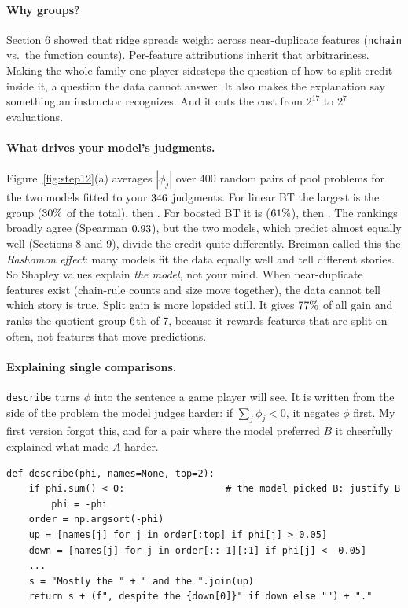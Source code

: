\documentclass[11pt]{article}
\theoremstyle{definition}
\theoremstyle{plain}
\theoremstyle{remark}
\newcommand{\code}[1]{\texttt{#1}}
\renewcommand{\_}{\oldunderscore\allowbreak}
\newcommand{\file}[1]{\textcolor{blue!50!black}{\texttt{#1}}}
\newcommand{\codefrom}[1]{\par\smallskip\noindent{\footnotesize\textbf{From} \file{#1}}}
\begin{document}
\paragraph{Why groups?}
Section 6 showed that ridge spreads weight across near-duplicate features (\code{n\_chain} vs.\ the function counts). Per-feature attributions inherit that
arbitrariness. Making the whole family one player sidesteps the question of how to split credit inside it, a question the data cannot answer.
It also makes the explanation say something an instructor recognizes. And it cuts the cost from $2^{17}$ to $2^7$ evaluations.

\paragraph{What drives your model's judgments.}
Figure~\ref{fig:step12}(a) averages $|\phi_j|$ over 400 random pairs of pool problems for the two models fitted to your $346$ judgments. For linear BT the largest is the
\emph{\XTopLin} group ($30\%$ of the total), then \emph{\XSecondLin}. For boosted BT it is \emph{\XTopBst} ($61\%$), then \emph{\XSecondBst}.
The rankings broadly agree (Spearman $0.93$), but the two models, which predict almost equally well (Sections 8 and 9), divide the credit quite differently.
Breiman called this the \emph{Rashomon effect}: many models fit the data equally well and tell different stories. So Shapley values explain \emph{the model}, not your mind.
When near-duplicate features exist (chain-rule counts and size move together), the data cannot tell which story is true. Split gain is more lopsided still. It gives
\emph{\XGainTopGroup} $77\%$ of all gain and ranks the quotient group $6$th of 7, because it rewards features that are split on often, not features that move predictions.

\paragraph{Explaining single comparisons.}
\code{describe} turns $\phi$ into the sentence a game player will see. It is written from the side of the problem the model judges harder: if $\sum_j\phi_j<0$, it negates $\phi$ first.
My first version forgot this, and for a pair where the model preferred $B$ it cheerfully explained what made $A$ harder.

\codefrom{src/calcdiff/explain.py}
\begin{lstlisting}
def describe(phi, names=None, top=2):
    if phi.sum() < 0:                  # the model picked B: justify B
        phi = -phi
    order = np.argsort(-phi)
    up = [names[j] for j in order[:top] if phi[j] > 0.05]
    down = [names[j] for j in order[::-1][:1] if phi[j] < -0.05]
    ...
    s = "Mostly the " + " and the ".join(up)
    return s + (f", despite the {down[0]}" if down else "") + "."
\end{lstlisting}
\end{document}
